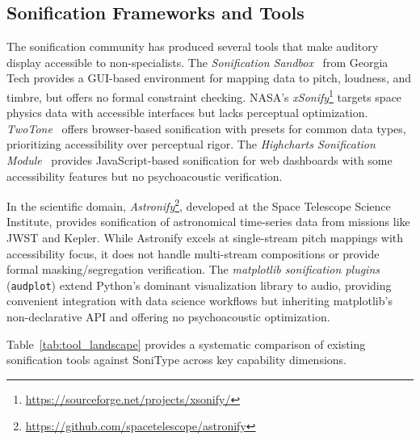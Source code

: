 \documentclass[sigchi, nonacm]{acmart}
\begin{document}
\subsection{Sonification Frameworks and Tools}

The sonification community has produced several tools that make auditory display accessible to non-specialists. The \emph{Sonification Sandbox}~\cite{walker2003sonificationsandbox} from Georgia Tech provides a GUI-based environment for mapping data to pitch, loudness, and timbre, but offers no formal constraint checking. NASA's \emph{xSonify}\footnote{\url{https://sourceforge.net/projects/xsonify/}} targets space physics data with accessible interfaces but lacks perceptual optimization. \emph{TwoTone}~\cite{twotone2020} offers browser-based sonification with presets for common data types, prioritizing accessibility over perceptual rigor. The \emph{Highcharts Sonification Module}~\cite{highcharts2022} provides JavaScript-based sonification for web dashboards with some accessibility features but no psychoacoustic verification.

In the scientific domain, \emph{Astronify}\footnote{\url{https://github.com/spacetelescope/astronify}}, developed at the Space Telescope Science Institute, provides sonification of astronomical time-series data from missions like JWST and Kepler. While Astronify excels at single-stream pitch mappings with accessibility focus, it does not handle multi-stream compositions or provide formal masking/segregation verification. The \emph{matplotlib sonification plugins} (\texttt{audplot}) extend Python's dominant visualization library to audio, providing convenient integration with data science workflows but inheriting matplotlib's non-declarative API and offering no psychoacoustic optimization.

Table~\ref{tab:tool_landscape} provides a systematic comparison of existing sonification tools against SoniType across key capability dimensions.
\end{document}
